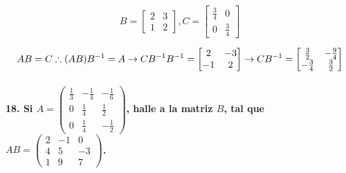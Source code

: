 \documentclass[
]{article}
\begin{document}
\[
B = \begin{bmatrix}
    2&3\\1&2
\end{bmatrix},
C = \begin{bmatrix}
    \frac{3}{4} & 0 \\
    0 & \frac{3}{4}
\end{bmatrix}
\]

\[
AB = C \therefore (AB)B^{-1} = A \rightarrow CB^{-1} \\
B^{-1} = \begin{bmatrix}
    2 & -3 \\ -1 & 2
\end{bmatrix} \rightarrow CB^{-1} = \begin{bmatrix}
    \frac{3}{2} & -\frac{9}{4} \\
    -\frac{3}{4} & \frac{3}{2}
\end{bmatrix}
\]

\hypertarget{si-a-beginpmatrix-frac13--frac14--frac16-0-frac14-frac12-0-frac14--frac12endpmatrix-halle-a-la-matriz-b-tal-que-ab-beginpmatrix2-1045-3197endpmatrix.}{%
\paragraph{\texorpdfstring{18. Si
\(A = \begin{pmatrix} \frac{1}{3} & -\frac{1}{4} & -\frac{1}{6} \\ 0 & \frac{1}{4} & \frac{1}{2} \\ 0 & \frac{1}{4} & -\frac{1}{2}\end{pmatrix}\),
halle a la matriz \(B\), tal que
\(AB = \begin{pmatrix}2&-1&0\\4&5&-3\\1&9&7\end{pmatrix}\).}{18. Si A = \textbackslash begin\{pmatrix\} \textbackslash frac\{1\}\{3\} \& -\textbackslash frac\{1\}\{4\} \& -\textbackslash frac\{1\}\{6\} \textbackslash\textbackslash{} 0 \& \textbackslash frac\{1\}\{4\} \& \textbackslash frac\{1\}\{2\} \textbackslash\textbackslash{} 0 \& \textbackslash frac\{1\}\{4\} \& -\textbackslash frac\{1\}\{2\}\textbackslash end\{pmatrix\}, halle a la matriz B, tal que AB = \textbackslash begin\{pmatrix\}2\&-1\&0\textbackslash\textbackslash4\&5\&-3\textbackslash\textbackslash1\&9\&7\textbackslash end\{pmatrix\}.}}\label{si-a-beginpmatrix-frac13--frac14--frac16-0-frac14-frac12-0-frac14--frac12endpmatrix-halle-a-la-matriz-b-tal-que-ab-beginpmatrix2-1045-3197endpmatrix.}}
\end{document}
